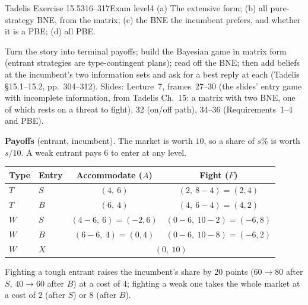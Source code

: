 \begin{exsol}{Tadelis Exercise 15.5}{316--317}{Exam level}{4}
\asked (a) The extensive form; (b) all pure-strategy BNE, from the matrix; (c) the BNE the incumbent prefers,
and whether it is a PBE; (d) all PBE.

\method Turn the story into terminal payoffs; build the Bayesian game in matrix form (entrant strategies are
type-contingent plans); read off the BNE; then add beliefs at the incumbent's two information sets and ask
for a best reply at each (Tadelis \S15.1--15.2, pp.~304--312). Slides: Lecture~7, frames~27--30 (the
slides' entry game with incomplete information, from Tadelis Ch.~15: a matrix with two BNE, one of which
rests on a threat to fight), 32 (on/off path), 34--36 (Requirements~1--4 and PBE).

\solution
\textbf{Payoffs} (entrant, incumbent). The market is worth $10$, so a share of $s\%$ is worth $s/10$. A weak
entrant pays $6$ to enter at any level.
\begin{center}
\begin{tabular}{llcc}
\toprule
Type & Entry & Accommodate ($A$) & Fight ($F$) \\
\midrule
$T$ & $S$ & $(4,\ 6)$ & $(2,\ 8 - 4) = (2, 4)$ \\
$T$ & $B$ & $(6,\ 4)$ & $(4,\ 6 - 4) = (4, 2)$ \\
$W$ & $S$ & $(4 - 6,\ 6) = (-2, 6)$ & $(0 - 6,\ 10 - 2) = (-6, 8)$ \\
$W$ & $B$ & $(6 - 6,\ 4) = (0, 4)$ & $(0 - 6,\ 10 - 8) = (-6, 2)$ \\
$W$ & $X$ & \multicolumn{2}{c}{$(0,\ 10)$} \\
\bottomrule
\end{tabular}
\end{center}
Fighting a tough entrant raises the incumbent's share by 20 points ($60 \to 80$ after $S$, $40 \to 60$ after $B$)
at a cost of $4$; fighting a weak one takes the whole market at a cost of $2$ (after $S$) or $8$ (after $B$).


\end{exsol}
